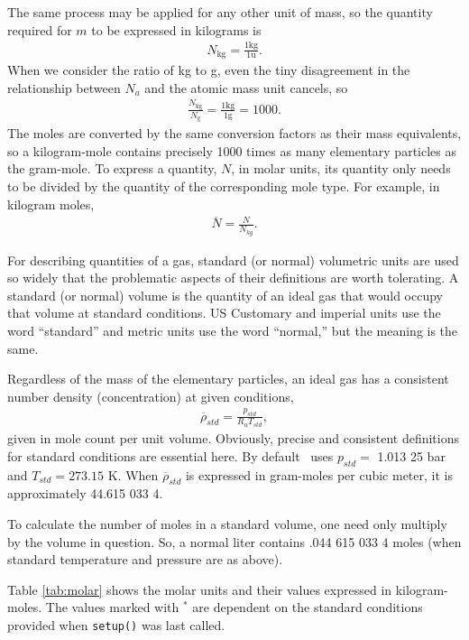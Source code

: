 The same process may be applied for any other unit of mass, so the quantity required for $m$ to be expressed in kilograms is
\begin{align}
N_\mathrm{kg} = \frac{1\mathrm{kg}}{1\mathrm{u}}.
\end{align}
When we consider the ratio of kg to g, even the tiny disagreement in the relationship between $N_a$ and the atomic mass unit cancels, so
\begin{align}
\frac{N_\mathrm{kg}}{N_\mathrm{g}} = \frac{1 \mathrm{kg}}{1 \mathrm{g}} = 1000.
\end{align}
The moles are converted by the same conversion factors as their mass equivalents, so a kilogram-mole contains precisely 1000 times as many elementary particles as the gram-mole.  To express a quantity, $N$, in molar units, its quantity only needs to be divided by the quantity of the corresponding mole type.  For example, in kilogram moles,
\begin{align}
\overline{N} = \frac{N}{N_{kg}}.
\end{align}

For describing quantities of a gas, standard (or normal) volumetric units are used so widely that the problematic aspects of their definitions are worth tolerating.  A standard (or normal) volume is the quantity of an ideal gas that would occupy that volume at standard conditions.  US Customary and imperial units use the word ``standard'' and metric units use the word ``normal,'' but the meaning is the same.  

Regardless of the mass of the elementary particles, an ideal gas has a consistent number density (concentration) at given conditions,
\begin{align}
\overline{\rho}_{std} = \frac{p_{std}}{R_u T_{std}},
\end{align}
given in mole count per unit volume.  Obviously, precise and consistent definitions for standard conditions are essential here.  By default \PM\ uses $p_{std} =$ 1.013 25 bar and $T_{std} = 273.15$ K.  When $\overline{\rho}_{std}$ is expressed in gram-moles per cubic meter, it is approximately 44.615 033 4.

To calculate the number of moles in a standard volume, one need only multiply by the volume in question.  So, a normal liter contains .044 615 033 4 moles (when standard temperature and pressure are as above).

Table \ref{tab:molar} shows the molar units and their values expressed in kilogram-moles.  The values marked with $^*$ are dependent on the standard conditions provided when \verb|setup()| was last called.


